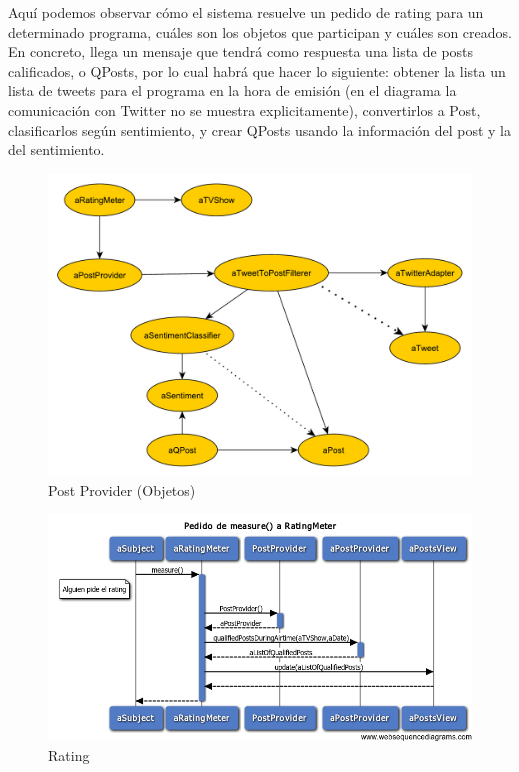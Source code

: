 Aquí podemos observar cómo el sistema resuelve un pedido de rating para un determinado programa, cuáles son los objetos que participan y cuáles son creados. En concreto, llega un mensaje que tendrá como respuesta una lista de posts calificados, o QPosts, por lo cual habrá que hacer lo siguiente: obtener la lista un lista de tweets para el programa en la hora de emisión (en el diagrama la comunicación con Twitter no se muestra explicitamente), convertirlos a Post, clasificarlos según sentimiento, y crear QPosts usando la información del post y la del sentimiento.

\begin{figure}[H]
\centering
\includegraphics[width=\textwidth]{graph/objetos/PostProvider.pdf}
\caption{Post Provider (Objetos)}
\end{figure}



\begin{figure}[H]
\centering
\includegraphics[scale=0.6]{graph/diagramas_secuencia/Rating.png}
\caption{Rating}
\end{figure}

